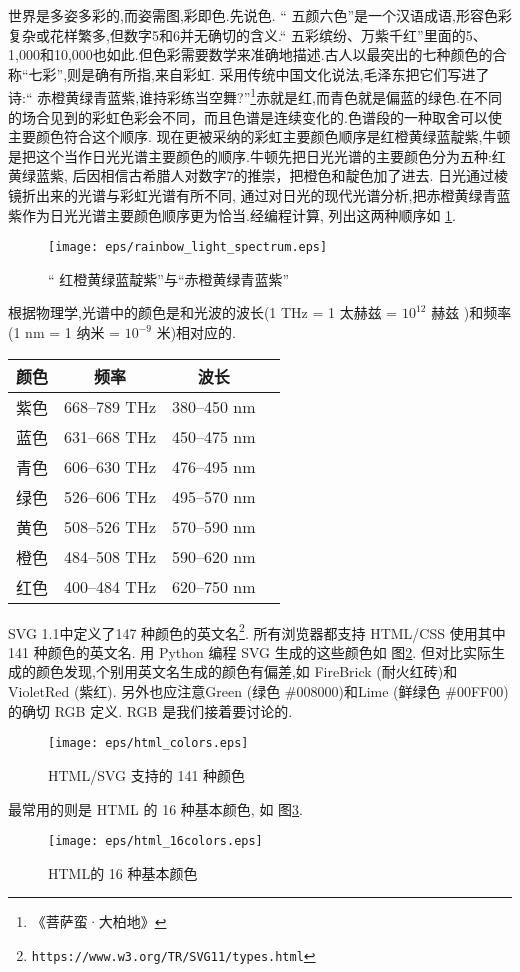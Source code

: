 世界是多姿多彩的,而姿需图,彩即色.先说色.
“ 五颜六色”是一个汉语成语,形容色彩复杂或花样繁多,但数字5和6并无确切的含义.“ 
五彩缤纷、万紫千红”里面的5、1,000和10,000也如此.但色彩需要数学来准确地描述.古人以最突出的七种颜色的合称“七彩”,则是确有所指,来自彩虹.
采用传统中国文化说法,毛泽东把它们写进了诗:“ 赤橙黄绿青蓝紫,谁持彩练当空舞?”\footnote{《菩萨蛮·大柏地》}赤就是红,而青色就是偏蓝的绿色.在不同的场合见到的彩虹色彩会不同，而且色谱是连续变化的.色谱段的一种取舍可以使主要颜色符合这个顺序.
现在更被采纳的彩虹主要颜色顺序是红橙黄绿蓝靛紫,牛顿是把这个当作日光光谱主要颜色的顺序.牛顿先把日光光谱的主要颜色分为五种:红黄绿蓝紫,
后因相信古希腊人对数字7的推崇，把橙色和靛色加了进去.
日光通过棱镜折出来的光谱与彩虹光谱有所不同,
通过对日光的现代光谱分析,把赤橙黄绿青蓝紫作为日光光谱主要颜色顺序更为恰当.经编程计算, 列出这两种顺序如 \ref{fig:1.4.1}.

\begin{figure}[h]
	\centering
	\texttt{[image: eps/rainbow\_light\_spectrum.eps]}
	\caption{“ 红橙黄绿蓝靛紫”与“赤橙黄绿青蓝紫” }
	\label{fig:1.4.1}
\end{figure}
根据物理学,光谱中的颜色是和光波的波长(1 THz = 1 太赫兹 = $10^{12}$ 赫兹 )和频率(1 nm = 1 纳米 = $10^{-9}$ 米)相对应的.
\begin{center}
	\begin{tabular}{c c c c} 
		\hline
		颜色 & 频率 & 波长  \\ [0.5ex] 
		\hline
		紫色 & 668–789 THz & 380–450 nm \\
		蓝色 & 631–668 THz & 450–475 nm \\
		青色 & 606–630 THz & 476–495 nm \\
		绿色 & 526–606 THz & 495–570 nm \\
		黄色 & 508–526 THz & 570–590 nm \\
		橙色 & 484–508 THz & 590–620 nm \\
		红色 & 400–484 THz & 620–750 nm \\		
		\hline
	\end{tabular}
\end{center}

SVG 1.1中定义了147 种颜色的英文名\footnote{ \texttt{https://www.w3.org/TR/SVG11/types.html}}.
所有浏览器都支持 HTML/CSS 使用其中 141 种颜色的英文名.
用 Python 编程 SVG 生成的这些颜色如 图\ref{fig:1.4.2}.
但对比实际生成的颜色发现,个别用英文名生成的颜色有偏差,如 FireBrick (耐火红砖)和
VioletRed (紫红). 另外也应注意Green (绿色 \#{}008000)和Lime (鲜绿色 \#{}00FF00)的确切 RGB 定义. RGB 是我们接着要讨论的.

\begin{figure}[h]
	\centering
	\texttt{[image: eps/html\_colors.eps]}
	\caption{HTML/SVG 支持的 141 种颜色}
	\label{fig:1.4.2}
\end{figure}

最常用的则是 HTML 的 16 种基本颜色, 如 图\ref{fig:1.4.3}.

\begin{figure}
	\centering
	\texttt{[image: eps/html\_16colors.eps]}
	\caption{HTML的 16 种基本颜色}
	\label{fig:1.4.3}
\end{figure}


